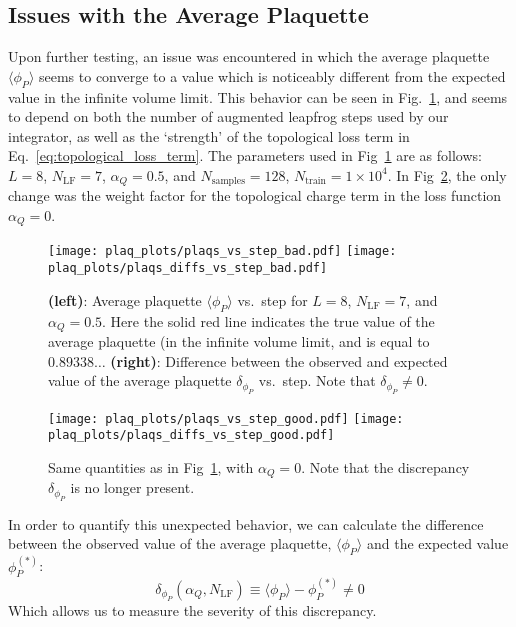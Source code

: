 \documentclass[../main.tex]{subfiles}
\begin{document}
\subsection{Issues with the Average Plaquette}
%
Upon further testing, an issue was encountered in which the average plaquette
$\langle \phi_{P}\rangle$ seems to converge to a value which is noticeably
different from the expected value in the infinite volume limit.
%
This behavior can be seen in Fig.~\ref{fig:bad_convergence}, and seems to
depend on both the number of augmented leapfrog steps used by our integrator,
as well as the `strength' of the topological loss term in
Eq.~\ref{eq:topological_loss_term}.
%
The parameters used in Fig~\ref{fig:bad_convergence} are as follows: $L = 8$,
$N_{\mathrm{LF}} = 7$, $\alpha_{Q} = 0.5$, and $N_{\mathrm{samples}} = 128$,
$N_{\mathrm{train}} = 1\times10^{4}$.
%
In Fig~\ref{fig:good_convergence}, the only change was the weight factor for the topological charge term in the loss
function $\alpha_{Q} = 0$.
%
\begin{figure}[htpb]%
  \centering
    \texttt{[image: plaq\_plots/plaqs\_vs\_step\_bad.pdf]}
    \texttt{[image: plaq\_plots/plaqs\_diffs\_vs\_step\_bad.pdf]}
    \caption{\textbf{(left)}: Average plaquette $\langle\phi_{P}\rangle$ vs.\
      step for $L=8$, $N_{\mathrm{LF}} = 7$, and $\alpha_{Q} = 0.5$. Here the
      solid red line indicates the true value of the average plaquette (in the
      infinite volume limit, and is equal to $0.89338\ldots$
      \textbf{(right)}: Difference between the observed and expected value of
      the average plaquette $\delta_{\phi_{P}}$ vs.\ step.  Note that
    $\delta_{\phi_{P}} \neq 0$.}%
\label{fig:bad_convergence}
\end{figure}
\begin{figure}[htpb]%
  \vspace{-20pt}
  \centering
    \texttt{[image: plaq\_plots/plaqs\_vs\_step\_good.pdf]}
    \texttt{[image: plaq\_plots/plaqs\_diffs\_vs\_step\_good.pdf]}
    \caption{Same quantities as in Fig~\ref{fig:bad_convergence}, with
    $\alpha_{Q} = 0$. Note that the discrepancy $\delta_{\phi_{P}}$ is no
  longer present.}
\label{fig:good_convergence}
\end{figure}
%
In order to quantify this unexpected behavior, we can calculate the difference
between the observed value of the average plaquette, $\langle \phi_{P}\rangle$
and the expected value $\phi_{P}^{(*)}$:
% 
\begin{equation}
  {\delta_{\phi_P}}(\alpha_Q, N_{\mathrm{LF}}) \equiv \langle \phi_P\rangle -
  \phi_{P}^{(*)} \neq 0
\end{equation}
%
Which allows us to measure the severity of this discrepancy.%
\end{document}
